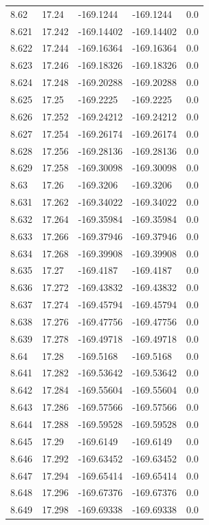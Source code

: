 \begin{tabular}{lllll}
8.62 & 17.24 & -169.1244 & -169.1244 & 0.0 \\
8.621 & 17.242 & -169.14402 & -169.14402 & 0.0 \\
8.622 & 17.244 & -169.16364 & -169.16364 & 0.0 \\
8.623 & 17.246 & -169.18326 & -169.18326 & 0.0 \\
8.624 & 17.248 & -169.20288 & -169.20288 & 0.0 \\
8.625 & 17.25 & -169.2225 & -169.2225 & 0.0 \\
8.626 & 17.252 & -169.24212 & -169.24212 & 0.0 \\
8.627 & 17.254 & -169.26174 & -169.26174 & 0.0 \\
8.628 & 17.256 & -169.28136 & -169.28136 & 0.0 \\
8.629 & 17.258 & -169.30098 & -169.30098 & 0.0 \\
8.63 & 17.26 & -169.3206 & -169.3206 & 0.0 \\
8.631 & 17.262 & -169.34022 & -169.34022 & 0.0 \\
8.632 & 17.264 & -169.35984 & -169.35984 & 0.0 \\
8.633 & 17.266 & -169.37946 & -169.37946 & 0.0 \\
8.634 & 17.268 & -169.39908 & -169.39908 & 0.0 \\
8.635 & 17.27 & -169.4187 & -169.4187 & 0.0 \\
8.636 & 17.272 & -169.43832 & -169.43832 & 0.0 \\
8.637 & 17.274 & -169.45794 & -169.45794 & 0.0 \\
8.638 & 17.276 & -169.47756 & -169.47756 & 0.0 \\
8.639 & 17.278 & -169.49718 & -169.49718 & 0.0 \\
8.64 & 17.28 & -169.5168 & -169.5168 & 0.0 \\
8.641 & 17.282 & -169.53642 & -169.53642 & 0.0 \\
8.642 & 17.284 & -169.55604 & -169.55604 & 0.0 \\
8.643 & 17.286 & -169.57566 & -169.57566 & 0.0 \\
8.644 & 17.288 & -169.59528 & -169.59528 & 0.0 \\
8.645 & 17.29 & -169.6149 & -169.6149 & 0.0 \\
8.646 & 17.292 & -169.63452 & -169.63452 & 0.0 \\
8.647 & 17.294 & -169.65414 & -169.65414 & 0.0 \\
8.648 & 17.296 & -169.67376 & -169.67376 & 0.0 \\
8.649 & 17.298 & -169.69338 & -169.69338 & 0.0 \\

\end{tabular}
